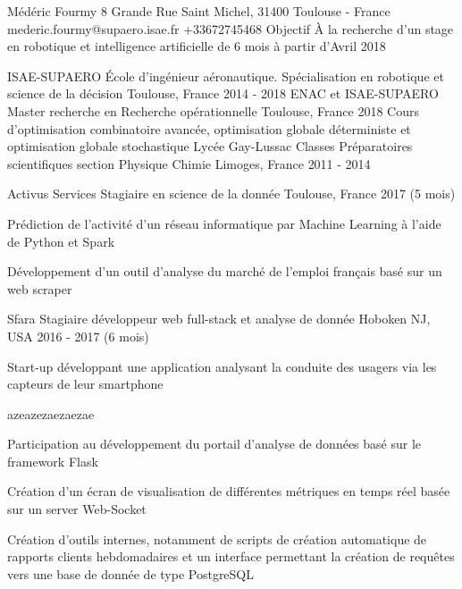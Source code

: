 \documentclass[11pt, a4paper, final]{resume}
\begin{document}
	\header
		{Médéric}
		{Fourmy}
		{8 Grande Rue Saint Michel, 31400 Toulouse - France}
		{mederic.fourmy@supaero.isae.fr}
		{+33672745468}
		{Objectif}
		{À la recherche d'un stage en robotique et intelligence artificielle de 6 mois à partir d'Avril 2018	}


	\begin{cventries}
		\cventry
		{ISAE-SUPAERO}
		{École d'ingénieur aéronautique. Spécialisation en robotique et science de la décision}
		{Toulouse, France}
		{2014 - 2018}
		{}
		\cventry
		{ENAC et ISAE-SUPAERO}
		{Master recherche en Recherche opérationnelle}
		{Toulouse, France}
		{2018}
		{Cours d'optimisation combinatoire avancée, optimisation globale déterministe et optimisation globale stochastique}
		\cventry
		{Lycée Gay-Lussac}
		{Classes Préparatoires scientifiques section Physique Chimie}
		{Limoges, France}
		{2011 - 2014}
		{}
	\end{cventries}

	\cvsection{Expérience professionnelle}
	\begin{cventries}
		\cventry
		{Activus Services}
		{Stagiaire en science de la donnée}
		{Toulouse, France}
		{2017 (5 mois)}
		{
			\begin{cvitems}{}
				\item Prédiction de l'activité d'un réseau informatique par Machine Learning à l'aide de Python et Spark
				\item Développement d'un outil d'analyse du marché de l'emploi français basé sur un web scraper
			\end{cvitems}
		}
		\cventry
		{Sfara}
		{Stagiaire développeur web full-stack et analyse de donnée}
		{Hoboken NJ, USA}
		{2016 - 2017 (6 mois)}
		{
			Start-up développant une application analysant la conduite des usagers via les capteurs de leur smartphone
			\begin{cvitems}{azeazezaezaezae}
				\item Participation au développement du portail d'analyse de données basé sur le framework Flask
				\item Création d'un écran de visualisation de différentes métriques en temps réel basée sur un server Web-Socket
				\item Création d'outils internes, notamment de scripts de création automatique de rapports clients hebdomadaires
							et un interface permettant la création de requêtes vers une base de donnée de type PostgreSQL
			\end{cvitems}
		}
	\end{cventries}
\end{document}

